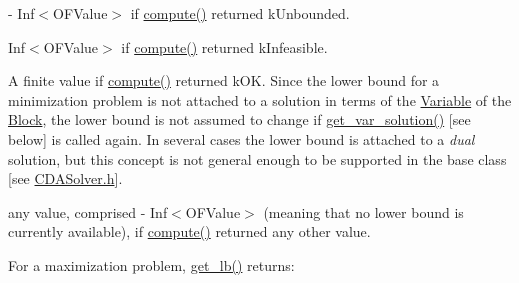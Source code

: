 \begin{DoxyItemize}
\item -\/ Inf$<$\+O\+F\+Value$>$ if \mbox{\hyperlink{class_s_m_spp__di__unipi__it_1_1_m_c_f_solver_afc8ff54ab05d22f4cca0fb0bfbeb7a49}{compute()}} returned k\+Unbounded.
\item Inf$<$\+O\+F\+Value$>$ if \mbox{\hyperlink{class_s_m_spp__di__unipi__it_1_1_m_c_f_solver_afc8ff54ab05d22f4cca0fb0bfbeb7a49}{compute()}} returned k\+Infeasible.
\item A finite value if \mbox{\hyperlink{class_s_m_spp__di__unipi__it_1_1_m_c_f_solver_afc8ff54ab05d22f4cca0fb0bfbeb7a49}{compute()}} returned k\+OK. Since the lower bound for a minimization problem is not attached to a solution in terms of the \mbox{\hyperlink{class_s_m_spp__di__unipi__it_1_1_variable}{Variable}} of the \mbox{\hyperlink{class_s_m_spp__di__unipi__it_1_1_block}{Block}}, the lower bound is not assumed to change if \mbox{\hyperlink{class_s_m_spp__di__unipi__it_1_1_m_c_f_solver_ac83fa9679882440d13fb5940494699c5}{get\+\_\+var\+\_\+solution()}} \mbox{[}see below\mbox{]} is called again. In several cases the lower bound is attached to a {\itshape dual} solution, but this concept is not general enough to be supported in the base class \mbox{[}see \mbox{\hyperlink{_c_d_a_solver_8h}{C\+D\+A\+Solver.\+h}}\mbox{]}.
\item any value, comprised -\/ Inf$<$\+O\+F\+Value$>$ (meaning that no lower bound is currently available), if \mbox{\hyperlink{class_s_m_spp__di__unipi__it_1_1_m_c_f_solver_afc8ff54ab05d22f4cca0fb0bfbeb7a49}{compute()}} returned any other value.
\end{DoxyItemize}

For a maximization problem, \mbox{\hyperlink{class_s_m_spp__di__unipi__it_1_1_m_c_f_solver_a064e49220c7f623cd53edbee8313c753}{get\+\_\+lb()}} returns\+:


